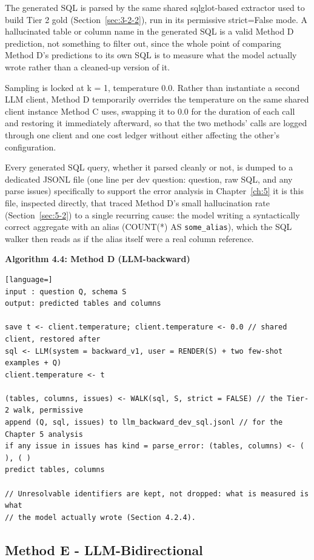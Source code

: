 The generated SQL is parsed by the same shared sqlglot-based extractor used to build Tier 2 gold (Section~\ref{sec:3-2-2}), run in its permissive strict=False mode. A hallucinated table or column name in the generated SQL is a valid Method D prediction, not something to filter out, since the whole point of comparing Method D's predictions to its own SQL is to measure what the model actually wrote rather than a cleaned-up version of it.

Sampling is locked at k = 1, temperature 0.0. Rather than instantiate a second LLM client, Method D temporarily overrides the temperature on the same shared client instance Method C uses, swapping it to 0.0 for the duration of each call and restoring it immediately afterward, so that the two methods' calls are logged through one client and one cost ledger without either affecting the other's configuration.

Every generated SQL query, whether it parsed cleanly or not, is dumped to a dedicated JSONL file (one line per dev question: question, raw SQL, and any parse issues) specifically to support the error analysis in Chapter~\ref{ch:5} it is this file, inspected directly, that traced Method D's small hallucination rate (Section~\ref{sec:5-2}) to a single recurring cause: the model writing a syntactically correct aggregate with an alias (COUNT(*) AS \texttt{some\_alias}), which the SQL walker then reads as if the alias itself were a real column reference.

\textbf{Algorithm 4.4: Method D (LLM-backward)}

\begin{lstlisting}[language=]
input : question Q, schema S
output: predicted tables and columns

save t <- client.temperature; client.temperature <- 0.0 // shared client, restored after
sql <- LLM(system = backward_v1, user = RENDER(S) + two few-shot examples + Q)
client.temperature <- t

(tables, columns, issues) <- WALK(sql, S, strict = FALSE) // the Tier-2 walk, permissive
append (Q, sql, issues) to llm_backward_dev_sql.jsonl // for the Chapter 5 analysis
if any issue in issues has kind = parse_error: (tables, columns) <- ( ), ( )
predict tables, columns

// Unresolvable identifiers are kept, not dropped: what is measured is what
// the model actually wrote (Section 4.2.4).
\end{lstlisting}

\subsection{Method E - LLM-Bidirectional}\label{sec:4-2-5}


